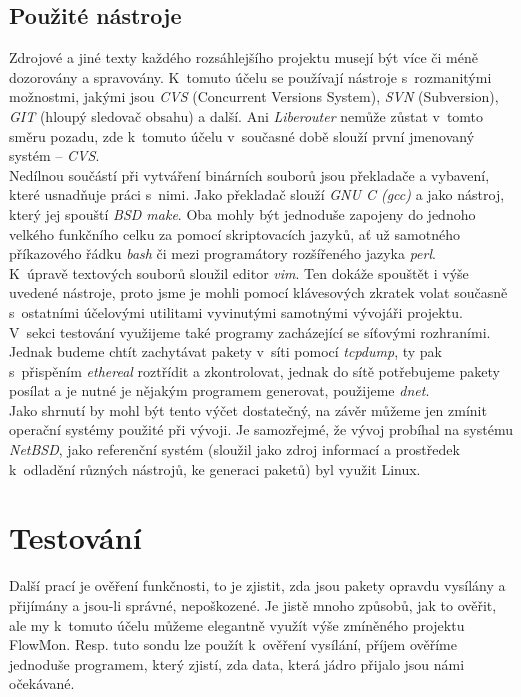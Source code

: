 \documentclass[final,11pt]{fithesis}
\newcommand{\nbsd}{\emph{NetBSD}}
\begin{document}
  \section{Použité nástroje}
  Zdrojové a jiné texty každého rozsáhlejšího projektu musejí být více či méně
  dozorovány a spravovány. K~tomuto účelu se používají nástroje
  s~rozmanitými možnostmi, jakými jsou \emph{CVS} (Concurrent Versions System),
  \emph{SVN} (Subversion), \emph{GIT} (hloupý sledovač obsahu) a další.
  Ani \emph{Liberouter} nemůže zůstat
  v~tomto směru pozadu, zde k~tomuto účelu v~současné době slouží první
  jmenovaný systém -- \emph{CVS}. \\ \indent
  Nedílnou součástí při vytváření binárních souborů jsou překladače a vybavení,
  které usnadňuje práci s~nimi. Jako překladač slouží \emph{GNU C (gcc)} a
  jako nástroj, který jej spouští \emph{BSD make}. Oba mohly být jednoduše
  zapojeny do
  jednoho velkého funkčního celku za pomocí skriptovacích jazyků, ať už
  samotného příkazového řádku \emph{bash} či mezi programátory rozšířeného
  jazyka \emph{perl}.\\ \indent
  K~úpravě textových souborů sloužil editor \emph{vim}. Ten dokáže spouštět i
  výše uvedené nástroje, proto jsme je mohli pomocí klávesových zkratek volat
  současně s~ostatními účelovými utilitami vyvinutými samotnými
  vývojáři projektu. \\ \indent
  V~sekci testování využijeme také programy zacházející se síťovými
  rozhraními. Jednak budeme chtít zachytávat pakety v~síti pomocí
  \emph{tcpdump}, ty pak s~přispěním \emph{ethereal} roztřídit a zkontrolovat,
  jednak do sítě potřebujeme pakety posílat a je nutné je
  nějakým programem generovat, použijeme \emph{dnet}. \\ \indent
  Jako shrnutí by mohl být tento výčet dostatečný, na závěr můžeme jen
  zmínit operační systémy použité při vývoji. Je samozřejmé, že vývoj probíhal
  na systému \nbsd, jako referenční systém (sloužil jako zdroj informací a
  prostředek k~odladění různých nástrojů, ke generaci paketů) byl využit
  Linux.



\chapter{Testování}
  Další prací je ověření funkčnosti, to je zjistit, zda jsou pakety opravdu
  vysílány a přijímány a jsou-li
  správné, nepoškozené. Je jistě mnoho způsobů, jak to ověřit, ale my k~tomuto
  účelu můžeme elegantně využít výše zmíněného projektu FlowMon. Resp. tuto
  sondu lze použít k~ověření vysílání, příjem ověříme jednoduše
  programem, který zjistí, zda data, která jádro přijalo jsou námi očekávané.
\end{document}
